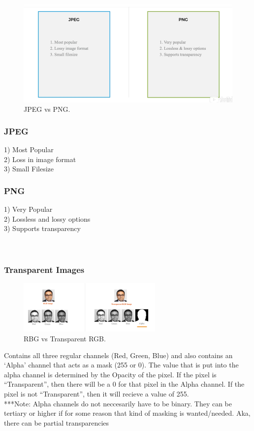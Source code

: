 \documentclass[fleqn]{article}
\begin{document}
    \begin{figure}
    \centering
    \includegraphics[width=325pt]{jpegvspng.png}
    \caption{\label{fig:jpegvspng}JPEG vs PNG.}
    \end{figure}


    \subsubsection{JPEG}
    1) Most Popular\\
    2) Loss in image format\\
    3) Small Filesize
    \subsubsection{PNG}
    1) Very Popular\\
    2) Lossless and lossy options\\
    3) Supports transparency\\ \\ \\
    \subsubsection{Transparent Images}

    \begin{figure}
    \centering
    \includegraphics[width=200pt]{Transparentimage.png}
    \caption{\label{fig:Transparentimage}RBG vs Transparent RGB.}
    \end{figure}
    Contains all three regular channels (Red, Green, Blue) and also contains an `Alpha' channel that acts as a mask (255 or 0). The value that is put into the alpha channel is determined by the Opacity of the pixel. If the pixel is ``Transparent'', then there will be a 0 for that pixel in the Alpha channel. If the pixel is not ``Transparent'', then it will recieve a value of 255.\\
    ***Note: Alpha channels do not neccesarily have to be binary. They can be tertiary or higher if for some reason that kind of masking is wanted/needed. Aka, there can be partial transparencies
\end{document}
